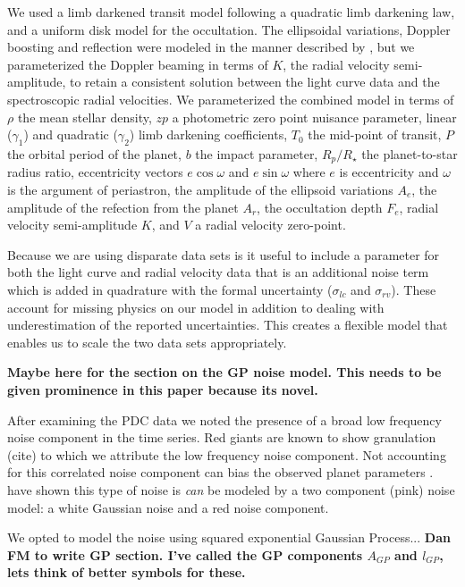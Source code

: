\documentclass[apjl]{emulateapj}
\begin{document}
We used a limb darkened transit model \citep{mandel02} following a quadratic limb darkening law, and a uniform disk model for the occultation. The ellipsoidal variations, Doppler boosting and reflection were modeled in the manner described by \citet{lillo13}, but we parameterized the Doppler beaming in terms of $K$, the radial velocity semi-amplitude, to retain a consistent solution between the light curve data and the spectroscopic radial velocities. We parameterized the combined model in terms of $\rho$ the mean stellar density, $zp$ a photometric zero point nuisance parameter, linear ($\gamma_1$) and quadratic ($\gamma_2$) limb darkening coefficients, $T_0$ the mid-point of transit, $P$ the orbital period of the planet, $b$ the impact parameter, $R_{p}/R_{\star}$ the planet-to-star radius ratio, eccentricity vectors $e\cos{\omega}$ and $e\sin{\omega}$ where $e$ is eccentricity and $\omega$ is the argument of periastron, the amplitude of the ellipsoid variations $A_e$, the amplitude of the refection from the planet $A_r$, the occultation depth $F_e$, radial velocity semi-amplitude $K$, and $V$ a radial velocity zero-point.

Because we are using disparate data sets is it useful to include a parameter for both the light curve and radial velocity data that is an additional noise term which is added in quadrature with the formal uncertainty ($\sigma_{lc}$ and $\sigma_{rv}$). These account for missing physics on our model in addition to dealing with underestimation of the reported uncertainties. This creates a flexible model that enables us to scale the two data sets appropriately. 

\textbf{Maybe here for the section on the GP noise model. This needs to be given prominence in this paper because its novel.}

After examining the PDC data we noted the presence of a broad low frequency noise component in the time series. Red giants are known to show granulation (cite) to which we attribute the low frequency noise component. Not accounting for this correlated noise component can bias the observed planet parameters \citep{carter09}. \citet{huber13b} have shown this type of noise is \emph{can} be modeled by a two component (pink) noise model: a white Gaussian noise and a red noise component. 

We opted to model the noise using squared exponential Gaussian Process... \textbf{Dan FM to write GP section. I've called the GP components $A_{GP}$ and $l_{GP}$, lets think of better symbols for these.}
\end{document}
